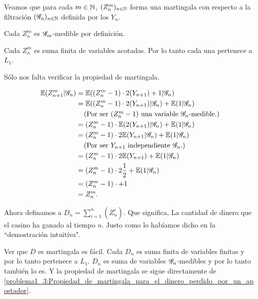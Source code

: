 	Veamos que para cada $m \in \mathbb{N}$, $(Z_n^m)_{n \in \mathbb{N}}$ forma una martingala con respecto a la filtración $(\mathscr{G}_n)_{n \in \mathbb{N}}$ 
	definida por los $Y_n$.\par\null
	
	Cada $Z_n^m$ es $\mathscr{G}_m$-medible por definición.\par\null
	
	Cada $Z_n^m$ es suma finita de variables acotadas. Por lo tanto cada una pertenece a $L_1$.\par\null
	
	Sólo nos falta verificar la propiedad de martingala.\par\null
	
	\begin{align}\label{problema1_3:Propiedad_de_martingala_para_el_dinero_perdido_por_un_apostador}
		\mathbb{E}(Z_{n+1}^{m} | \mathscr{G}_n) &= \mathbb{E}((Z_n^{m} - 1) \cdot 2(Y_{n+1}) + 1 | \mathscr{G}_n)					\\
							   &= \mathbb{E}((Z_n^{m} -1) \cdot 2(Y_{n+1}) | \mathscr{G}_n) + \mathbb{E}( 1 | \mathscr{G}_n)		\\
							   &\;\;\;\;\mbox{(Por ser $(Z_n^{m} - 1)$ una variable $\mathscr{G}_n$-medible.)}	\\
							   &= (Z_n^{m} -1) \cdot \mathbb{E}(  2(Y_{n+1}) | \mathscr{G}_n) + \mathbb{E}( 1 | \mathscr{G}_n)	\\
							   &= (Z_n^{m} -1) \cdot 2\mathbb{E}( Y_{n+1} | \mathscr{G}_n) + \mathbb{E}( 1 | \mathscr{G}_n)		\\
							   &\;\;\;\;\mbox{(Por ser $Y_{n + 1}$ independiente $\mathscr{G}_n$.)}				\\
							   &= (Z_n^{m} -1) \cdot 2\mathbb{E}( Y_{n+1}) + \mathbb{E}( 1 | \mathscr{G}_n)				\\
							   &= (Z_n^{m} -1) \cdot 2 \frac{1}{2} + \mathbb{E}( 1 | \mathscr{G}_n)				\\
							   &= (Z_n^{m} -1) \cdot + 1 										\\
							   &= Z_n^m.
	\end{align}\par\null
	
	Ahora definamos a $D_n = \sum_{i=1}^n (Z_n^i)$. Que significa, La cantidad de dinero que el casino ha ganado al tiempo $n$. 
	Justo como lo habíamos dicho en la ``demostración intuitiva".\par\null
	
	Ver que $D$ es martingala es fácil. Cada $D_n$ es suma finita de variables finitas y por lo tanto pertenece a $L_1$.
	$D_n$ es suma de variables $\mathscr{G}_n$-medibles y por lo tanto también lo es. Y la propiedad de martingala se sigue directamente de
	\eqref{problema1_3:Propiedad_de_martingala_para_el_dinero_perdido_por_un_apostador}.\par\null
	
